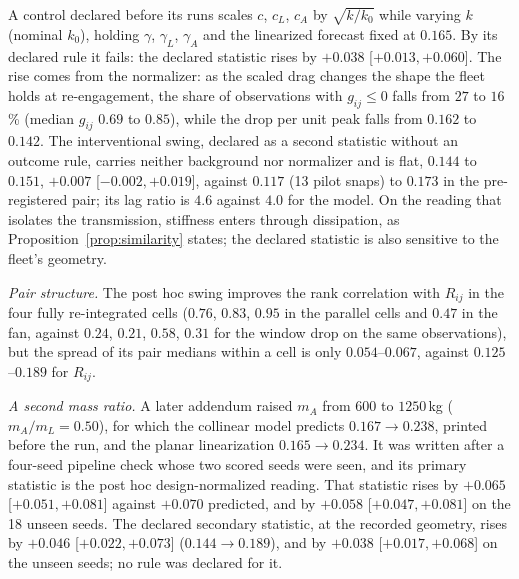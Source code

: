 A control declared before its runs scales $c$, $c_L$, $c_A$ by $\sqrt{k/k_0}$ while varying $k$ (nominal $k_0$), holding $\gamma$, $\gamma_L$, $\gamma_A$ and the linearized forecast fixed at $0.165$. By its declared rule it fails: the declared statistic rises by $+0.038$ [$+0.013,+0.060$]. The rise comes from the normalizer: as the scaled drag changes the shape the fleet holds at re-engagement, the share of observations with $g_{ij}\le0$ falls from $27$ to $16$\% (median $g_{ij}$ $0.69$ to $0.85$), while the drop per unit peak falls from $0.162$ to $0.142$. The interventional swing, declared as a second statistic without an outcome rule, carries neither background nor normalizer and is flat, $0.144$ to $0.151$, $+0.007$ [$-0.002,+0.019$], against $0.117$ (13 pilot snaps) to $0.173$ in the pre-registered pair; its lag ratio is $4.6$ against $4.0$ for the model. On the reading that isolates the transmission, stiffness enters through dissipation, as Proposition~\ref{prop:similarity} states; the declared statistic is also sensitive to the fleet's geometry.

\noindent\textit{Pair structure.}
The post hoc swing improves the rank correlation with $R_{ij}$ in the four fully re-integrated cells ($0.76$, $0.83$, $0.95$ in the parallel cells and $0.47$ in the fan, against $0.24$, $0.21$, $0.58$, $0.31$ for the window drop on the same observations), but the spread of its pair medians within a cell is only $0.054$--$0.067$, against $0.125$--$0.189$ for $R_{ij}$.

\noindent\textit{A second mass ratio.}
A later addendum raised $m_A$ from $600$ to $1250$\,kg ($m_A/m_L=0.50$), for which the collinear model predicts $0.167\to0.238$, printed before the run, and the planar linearization $0.165\to0.234$. It was written after a four-seed pipeline check whose two scored seeds were seen, and its primary statistic is the post hoc design-normalized reading. That statistic rises by $+0.065$ [$+0.051,+0.081$] against $+0.070$ predicted, and by $+0.058$ [$+0.047,+0.081$] on the 18 unseen seeds. The declared secondary statistic, at the recorded geometry, rises by $+0.046$ [$+0.022,+0.073$] ($0.144\to0.189$), and by $+0.038$ [$+0.017,+0.068$] on the unseen seeds; no rule was declared for it.

